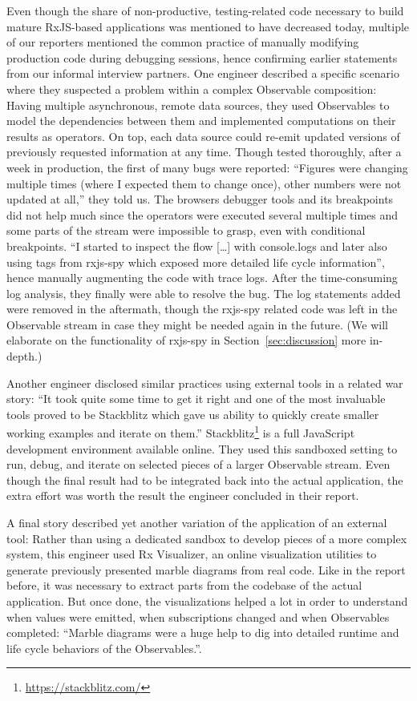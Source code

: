 \documentclass[12pt,a4paper]{article}
\begin{document}
Even though the share of non-productive, testing-related code necessary to build mature RxJS-based applications was mentioned to have decreased today, multiple of our reporters mentioned the common practice of manually modifying production code during debugging sessions, hence confirming earlier statements from our informal interview partners. One engineer described a specific scenario where they suspected a problem within a complex Observable composition: Having multiple asynchronous, remote data sources, they used Observables to model the dependencies between them and implemented computations on their results as operators. On top, each data source could re-emit updated versions of previously requested information at any time. Though tested thoroughly, after a week in production, the first of many bugs were reported: ``Figures were changing multiple times (where I expected them to change once), other numbers were not updated at all,'' they told us. The browsers debugger tools and its breakpoints did not help much since the operators were executed several multiple times and some parts of the stream were impossible to grasp, even with conditional breakpoints. ``I started to inspect the flow [\dots] with console.logs and later also using tags from rxjs-spy which exposed more detailed life cycle information'', hence manually augmenting the code with trace logs. After the time-consuming log analysis, they finally were able to resolve the bug. The log statements added were removed in the aftermath, though the rxjs-spy related code was left in the Observable stream in case they might be needed again in the future. (We will elaborate on the functionality of rxjs-spy in Section~\ref{sec:discussion} more in-depth.)

Another engineer disclosed similar practices using external tools in a related war story: ``It took quite some time to get it right and one of the most invaluable tools proved to be Stackblitz which gave us ability to quickly create smaller working examples and iterate on them.'' Stackblitz\footnote{\url{https://stackblitz.com/}} is a full JavaScript development environment available online. They used this sandboxed setting to run, debug, and iterate on selected pieces of a larger Observable stream. Even though the final result had to be integrated back into the actual application, the extra effort was worth the result the engineer concluded in their report.

A final story described yet another variation of the application of an external tool: Rather than using a dedicated sandbox to develop pieces of a more complex system, this engineer used Rx Visualizer, an online visualization utilities to generate previously presented marble diagrams from real code. Like in the report before, it was necessary to extract parts from the codebase of the actual application. But once done, the visualizations helped a lot in order to understand when values were emitted, when subscriptions changed and when Observables completed: ``Marble diagrams were a huge help to dig into detailed runtime and life cycle behaviors of the Observables.''.
\end{document}

